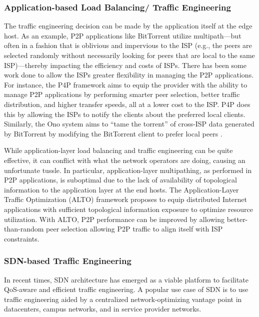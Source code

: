 \documentclass[10pt]{IEEEtran}
\begin{document}
\vspace{2mm}
\subsubsection{Application-based Load Balancing/ Traffic Engineering}

The traffic engineering decision can be made by the application itself at the edge host. As an example, P2P applications like BitTorrent utilize multipath---but often in a fashion that is oblivious and impervious to the ISP (e.g., the peers are selected randomly without necessarily looking for peers that are local to the same ISP)---thereby impacting the efficiency and costs of ISPs. There has been some work done to allow the ISPs greater flexibility in managing the P2P applications. For instance, the P4P framework \cite{xie2008p4p} aims to equip the provider with the ability to manage P2P applications by performing smarter peer selection, better traffic distribution, and higher transfer speeds, all at a lower cost to the ISP. P4P does this by allowing the ISPs to notify the clients about the preferred local clients. Similarly, the Ono system aims to ``tame the torrent'' of cross-ISP data generated by BitTorrent by modifying the BitTorrent client to prefer local peers \cite{choffnes2008taming}.

While application-layer load balancing and traffic engineering can be quite effective, it can conflict with what the network operators are doing, causing an unfortunate tussle. In particular, application-layer multipathing, as performed in P2P applications, is suboptimal due to the lack of availability of topological information  to the application layer at the end hosts. The Application-Layer Traffic Optimization (ALTO) framework \cite{seedorf2009application} proposes to equip distributed Internet applications with sufficient topological information exposure to optimize resource utilization.  With ALTO, P2P performance can be improved by allowing better-than-random peer selection allowing P2P traffic to align itself with ISP constraints.

\vspace{2mm}
\subsubsection{SDN-based Traffic Engineering}


In recent times, SDN architecture has emerged as a viable platform to facilitate QoS-aware and efficient traffic engineering. A popular use case of SDN is to use traffic engineering aided by a centralized network-optimizing vantage point in datacenters, campus networks, and in service provider networks. 
\end{document}
